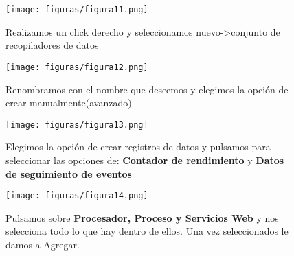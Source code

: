 \begin{figure}[H] %
	\centering
	\texttt{[image: figuras/figura11.png]}  %
	\label{figura11}
	
	\caption{Realizamos un click derecho y seleccionamos nuevo->conjunto de recopiladores de datos} 
\end{figure}

\begin{figure}[H] %
	\centering
	\texttt{[image: figuras/figura12.png]}  %
	\label{figura12}
	
	\caption{Renombramos con el nombre que deseemos y elegimos la opción de crear manualmente(avanzado)} 
\end{figure}

\begin{figure}[H] %
	\centering
	\texttt{[image: figuras/figura13.png]}  %
	\label{figura13}
	
	\caption{Elegimos la opción de crear registros de datos y pulsamos para seleccionar las opciones de: \textbf{Contador de rendimiento} y \textbf{Datos de seguimiento de eventos}} 
\end{figure}
\begin{figure}[H] %
	\centering
	\texttt{[image: figuras/figura14.png]}  %
	\label{figura14}
	
	\caption{Pulsamos sobre \textbf{Procesador, Proceso y Servicios Web} y nos selecciona todo lo que hay dentro de ellos. Una vez seleccionados le damos a Agregar.} 
\end{figure}

